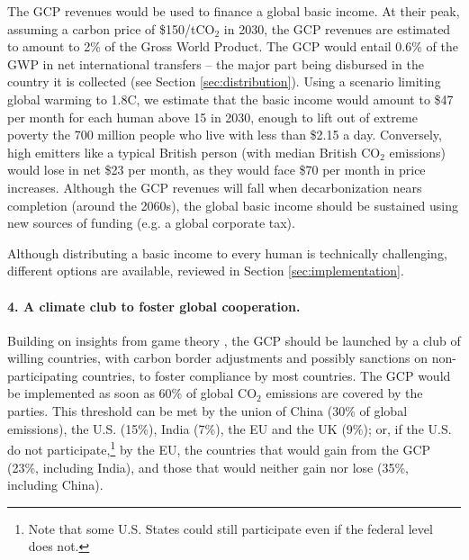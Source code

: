 \documentclass[12pt,english]{article}
\begin{document}
The GCP revenues would be used to finance a global basic income. At their peak, assuming a carbon price of \$150/tCO$_\text{2}$ in 2030, the GCP revenues are estimated to amount to 2\% of the Gross World Product. The GCP would entail 0.6\% of the GWP in net international transfers -- the major part being disbursed in the country it is collected (see Section \ref{sec:distribution}). %
Using a scenario limiting global warming to 1.8\textdegree{}C,%
we estimate that the basic income would amount to \$47 per month for each human above 15 in 2030, enough to lift out of extreme poverty the 700 million people who live with less than \$2.15 a day. %
Conversely, high emitters like a typical British person (with median British CO$_\text{2}$ emissions) would lose in net \$23 per month, as they would face \$70 per month in price increases. %
Although the GCP revenues will fall when decarbonization nears completion (around the 2060s), the global basic income should be sustained using new sources of funding (e.g. a global corporate tax). 

Although distributing a basic income to every human is technically challenging, different options are available, reviewed in Section \ref{sec:implementation}. 

\paragraph*{4. A climate club to foster global cooperation.}

Building on insights from game theory \citep{mackay_price_2015, nordhaus_climate_2015}, the GCP should be launched by a club of willing countries, with carbon border adjustments and possibly sanctions on non-participating countries, to foster compliance by most countries. 
The GCP would be implemented as soon as 60\% of global CO$_\text{2}$ emissions are covered by the parties. This threshold can be met by the union of China (30\% of global emissions), the U.S. (15\%), India (7\%), the EU and the UK (9\%); or, if the U.S. do not participate,\footnote{Note that some U.S. States could still participate even if the federal level does not.} by the EU, the countries that would gain from the GCP (23\%, including India), and those that would neither gain nor lose (35\%, including China).
\end{document}
